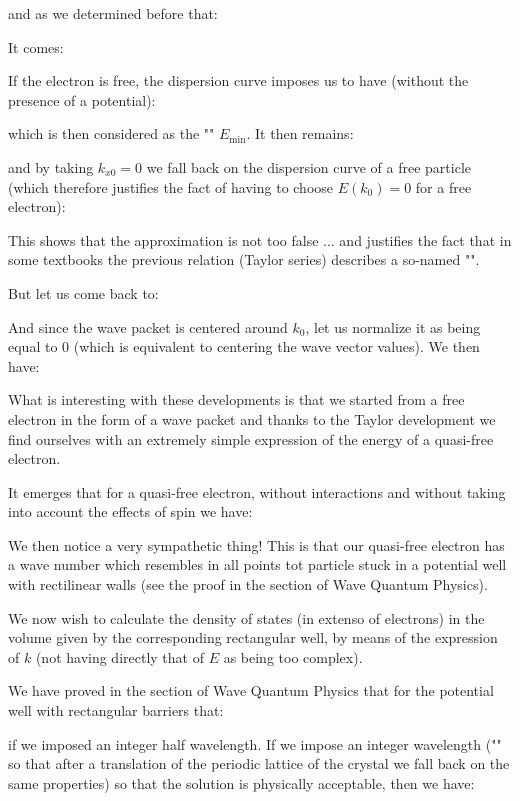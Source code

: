 	and as we determined before that:
	
	It comes:
	
	If the electron is free, the dispersion curve imposes us to have (without the presence of a potential):
	
	which is then considered as the "" $E_{\min}$. It then remains:
	
	and by taking $k_{x0}=0$ we fall back on the dispersion curve of a free particle (which therefore justifies the fact of having to choose $E(k_0)=0$ for a free electron):
	
	This shows that the approximation is not too false ... and justifies the fact that in some textbooks the previous relation (Taylor series) describes a so-named "".

	But let us come back to:
	
	And since the wave packet is centered around $k_0$, let us normalize it as being equal to $0$ (which is equivalent to centering the wave vector values). We then have:
	
	What is interesting with these developments is that we started from a free electron in the form of a wave packet and thanks to the Taylor development we find ourselves with an extremely simple expression of the energy of a quasi-free electron.

	It emerges that for a quasi-free electron, without interactions and without taking into account the effects of spin we have:
	
	We then notice a very sympathetic thing! This is that our quasi-free electron has a wave number which resembles in all points tot particle stuck in a potential well with rectilinear walls (see the proof in the section of Wave Quantum Physics).

	We now wish to calculate the density of states (in extenso of electrons) in the volume given by the corresponding rectangular well, by means of the expression of $k$ (not having directly that of $E$ as being too complex).

	We have proved in the section of Wave Quantum Physics that for the potential well with rectangular barriers that:
	
	if we imposed an integer half wavelength. If we impose an integer wavelength ("" so that after a translation of the periodic lattice of the crystal we fall back on the same properties) so that the solution is physically acceptable, then we have:
	
